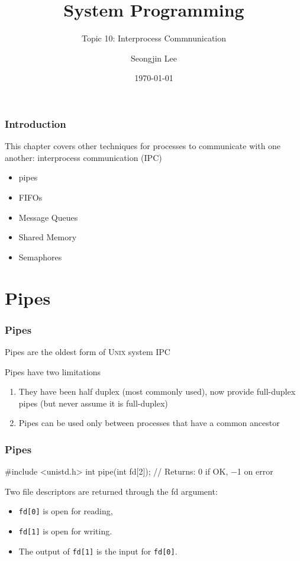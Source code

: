 \documentclass[newPxFont,sthlmFooter,nooffset]{beamer}
\title{System Programming}
\subtitle{Topic 10: Interprocess Commnunication}
\author[SJL]{Seongjin Lee}
\institute{\href{mailto:insight@gnu.ac.kr}{insight@gnu.ac.kr}\\\url{http://open.gnu.ac.kr}\\Systems Research Lab.\\Gyeongsang National University}
\date{\today}
\begin{document}
\frame[plain]{\titlepage}






\begin{frame}[t]
  \frametitle{Introduction}



This chapter covers other techniques for processes to communicate with one another: interprocess communication (IPC)
\begin{itemize}
\item pipes
\item FIFOs
\item Message Queues
\item Shared Memory
\item Semaphores
\end{itemize}
\end{frame}

\section{Pipes}

\begin{frame}[t, fragile]
  \frametitle{Pipes}
Pipes are the oldest form of \textsc{Unix} system IPC

Pipes have two limitations
\begin{enumerate}
\item They have been half duplex (most commonly used), now provide full-duplex pipes (but never assume it is full-duplex)
\item Pipes can be used only between processes that have a common ancestor
\end{enumerate}

\end{frame}


\begin{frame}[t, fragile]
  \frametitle{Pipes}
\begin{codedef}
#include <unistd.h>
int pipe(int fd[2]);
// Returns: 0 if OK, −1 on error
\end{codedef}
Two file descriptors are returned through the fd argument:
\begin{itemize}
\item \texttt{fd[0]} is open for reading,
\item \texttt{fd[1]} is open for writing.
\item The output of \texttt{fd[1]} is the input for \texttt{fd[0]}.
\end{itemize}

\end{frame}
\end{document}

